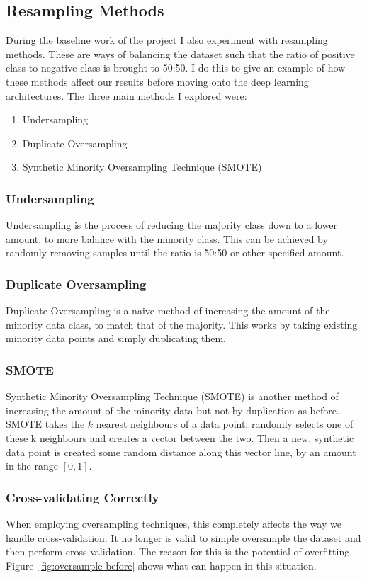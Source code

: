 \documentclass[12pt,a4paper,twoside]{report}
\begin{document}
\subsection{Resampling Methods}

During the baseline work of the project I also experiment with resampling methods. These are ways of balancing the dataset such that the ratio of positive class to negative class is brought to 50:50. I do this to give an example of how these methods affect our results before moving onto the deep learning architectures. 
The three main methods I explored were:

\begin{enumerate}
  \item Undersampling 
  \item Duplicate Oversampling
  \item Synthetic Minority Oversampling Technique (SMOTE)
\end{enumerate}

\subsubsection{Undersampling}
Undersampling is the process of reducing the majority class down to a lower amount, to more balance with the minority class. This can be achieved by randomly removing samples until the ratio is 50:50 or other specified amount. 


\subsubsection{Duplicate Oversampling}
Duplicate Oversampling is a naive method of increasing the amount of the minority data class, to match that of the majority. This works by taking existing minority data points and simply duplicating them.

\subsubsection{SMOTE}
Synthetic Minority Oversampling Technique (SMOTE) is another method of increasing the amount of the minority data but not by duplication as before. SMOTE takes the $k$ nearest neighbours of a data point, randomly selects one of these k neighbours and creates a vector between the two. Then a new, synthetic data point is created some random distance along this vector line, by an amount in the range $[0,1]$.

\subsubsection{Cross-validating Correctly}
When employing oversampling techniques, this completely affects the way we handle cross-validation. It no longer is valid to simple oversample the dataset and then perform cross-validation. The reason for this is the potential of overfitting. Figure~\ref{fig:oversample-before} shows what can happen in this situation. 
\end{document}
